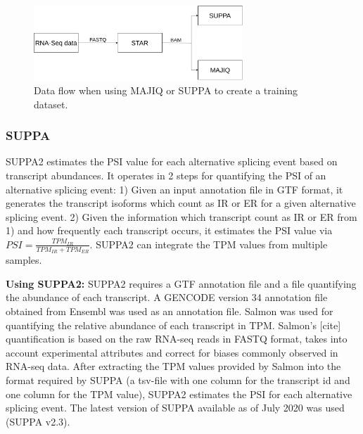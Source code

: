 \begin{figure}
	\centering\includegraphics[width=0.7\textwidth]{figures/d2v-Page-3.pdf} 
	\caption{Data flow when using MAJIQ or SUPPA to create a training dataset. }
	\label{fig:dataset_creation_process}
\end{figure}
\subsubsection{SUPPA}\label{subsubsec:suppa}
SUPPA2 \cite{suppa2} estimates the PSI value for each alternative splicing event based on transcript abundances. It operates in 2 steps for quantifying the PSI of an alternative splicing event:
1) Given an input annotation file in GTF format, it generates the transcript isoforms which count as IR or ER for a given alternative splicing event.
2) Given the information which transcript count as IR or ER from 1) and how frequently each transcript occurs, it estimates the PSI value via $PSI = \frac{TPM_{IR}}{TPM_{IR} + TPM_{ER}}$. SUPPA2 can integrate the TPM values from multiple samples.


\textbf{Using SUPPA2:}
SUPPA2 requires a GTF annotation file and a file quantifying the abundance of each transcript. A GENCODE version 34 annotation file obtained from Ensembl was used as an annotation file. Salmon was used for quantifying the relative abundance of each transcript in TPM. Salmon's [cite] quantification is based on the raw RNA-seq reads in FASTQ format, takes into account experimental attributes and correct for biases commonly observed in RNA-seq data. After extracting the TPM values provided by Salmon into the format required by SUPPA (a tsv-file with one column for the transcript id and one column for the TPM value), SUPPA2 estimates the PSI for each alternative splicing event.
The latest version of SUPPA available as of July 2020 was used (SUPPA v2.3). 
